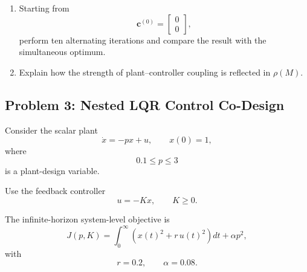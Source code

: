 \begin{enumerate}
    Compute $\rho(M)$ and determine whether the iterative sequential
    method converges.

    \item Starting from
    \begin{equation}
    \mathbf{c}^{(0)}=
    \begin{bmatrix}
    0\\0
    \end{bmatrix},
    \end{equation}
    perform ten alternating iterations and compare the result with the
    simultaneous optimum.

    \item Explain how the strength of plant--controller coupling is reflected
    in $\rho(M)$.
\end{enumerate}


\subsection*{Problem 3: Nested LQR Control Co-Design}

Consider the scalar plant
\begin{equation}
\dot{x}=-px+u,
\qquad
x(0)=1,
\end{equation}
where
\begin{equation}
0.1\leq p\leq3
\end{equation}
is a plant-design variable.

Use the feedback controller
\begin{equation}
u=-Kx,
\qquad
K\geq0.
\end{equation}

The infinite-horizon system-level objective is
\begin{equation}
J(p,K)
=
\int_0^\infty
\left(
x(t)^2+r\,u(t)^2
\right)dt
+
\alpha p^2,
\end{equation}
with
\begin{equation}
r=0.2,
\qquad
\alpha=0.08.
\end{equation}

